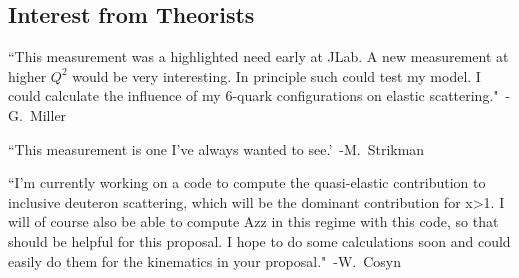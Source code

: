 \subsection{Interest from Theorists}

``This measurement was a highlighted need early at JLab. A new measurement at higher $Q^2$ would be very interesting. In principle such could test my model. I could calculate the influence of my 6-quark configurations on elastic scattering."~-G.~Miller

``This measurement is one I've always wanted to see.'~-M.~Strikman

``I'm currently working on a code to compute the quasi-elastic  contribution to inclusive deuteron scattering, which will be the dominant contribution for x>1.  I will of course also be able to compute Azz in this regime with this 
code, so that should be helpful for this proposal. I hope to do some 
calculations soon and could easily do them for the kinematics in your 
proposal."~-W.~Cosyn